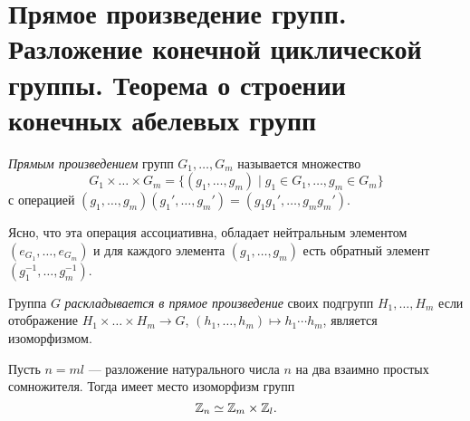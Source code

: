 \section{Прямое произведение групп. Разложение конечной циклической группы. Теорема о строении конечных абелевых групп}

\begin{definition}
    \textit{Прямым произведением} групп $G_1, \dots, G_m$ называется множество
    \begin{equation*}
        G_1 \times \dots \times G_m = \{(g_1, \dots, g_m) \mid g_1 \in G_1 , \dots, g_m \in G_m\}
    \end{equation*}
    с операцией $(g_1, \dots, g_m)(g_1', \dots, g_m') = (g_1g_1', \dots, g_m g_m')$.
\end{definition}

Ясно, что эта операция ассоциативна, обладает нейтральным элементом $(e_{G_1}, \dots, e_{G_m})$ и для каждого элемента $(g_1, \dots, g_m)$ есть обратный элемент $(g_1^{-1}, \dots, g_m^{-1})$.

\begin{comment}
    Группа $G_1 \times \dots \times G_m$ коммутативна в точности тогда, когда коммутативна каждая из групп $G_1, \dots, G_m$.
\end{comment}

\begin{comment}
    Если все группы $G_1, \dots, G_m$ конечны, то $\left|G_1 \times \dots \times G_m\right| = \left|G_1\right| \cdots \left|G_m\right|$.
\end{comment}

\begin{definition}
    Группа $G$ \textit{раскладывается в прямое произведение} своих подгрупп $H_1, \dots, H_m$ если отображение $H_1 \times \dots \times H_m \to G$, $(h_1, \dots, h_m) \mapsto h_1 \cdots h_m$, является изоморфизмом.
\end{definition}

\begin{theorem}
    Пусть $n = ml$ --- разложение натурального числа $n$ на два взаимно простых сомножителя. Тогда имеет место изоморфизм групп
    \begin{equation*}
        \mathbb{Z}_n \simeq \mathbb{Z}_m \times \mathbb{Z}_l
    .\end{equation*}
\end{theorem}

